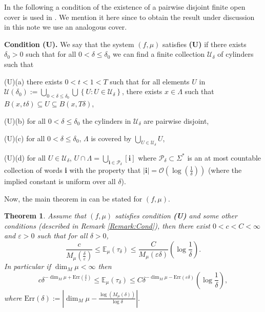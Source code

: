 \documentclass[11pt, reqno]{amsart}
\theoremstyle{plain}%
\newtheorem{theorem}{Theorem}[section]
\theoremstyle{definition}
\theoremstyle{definition}
\def\P{\ensuremath{\mathcal P}}
\def\E{\mathbb E}
\numberwithin{equation}{section}
\begin{document}
 In the following a condition of the existence of a pairwise disjoint finite open cover is used in \cite{MikeNatali}. We mention it here since to obtain the result under discussion in this note we use an analogous cover.

\label{Condition (U)}\textbf{Condition (U).} We say that the system $(f,\mu)$ satisfies \textbf{(U)} if there exists $\delta_0>0$ such that for all $0<\delta\le \delta_0$ we can find a finite collection $\mathcal{U}_{\delta}$ of cylinders such that

(U)(a) there exists $0<t<1<T$ such that for all elements $U$ in $\mathcal{U}(\delta_0):=\bigcup_{0<\delta\le \delta_0}\bigcup\left\{U:U\in \mathcal{U}_{\delta}\right\} $, there exists $x\in\Lambda$ such that $B(x,t\delta)\subseteq  U \subseteq B(x,T\delta)$,

(U)(b) for all $0<\delta\le \delta_0$ the cylinders in $\mathcal{U}_{\delta}$ are pairwise disjoint,

(U)(c) for all $0<\delta\le \delta_0$, $\Lambda$ is covered by $\bigcup_{U\in\mathcal{U}_{\delta}}U$,

(U)(d) for all $U\in \mathcal{U}_{\delta}$, $U\cap\Lambda= \bigcup_{\textbf{i}\in\P_{\delta}}[\textbf{i}]$ where $\P_{\delta}\subset\Sigma^*$ is an at most countable collection of words \textbf{i} with the property that $|\textbf{i}|=\mathcal{O}(\log(\frac{1}{\delta}))$ (where the implied constant is uniform over all $\delta$).

Now, the main theorem in \cite{MikeNatali} can be stated for $(f,\mu)$.
\begin{theorem}\label{Th:MN_main_theorem}
    \cite[Theorem 2.2]{MikeNatali} Assume that $(f,\mu)$ satisfies condition \textbf{(U)} and some other conditions (described in Remark \ref{Remark:Cond}), then there exist $0<c<C<\infty$ and $\varepsilon>0$ such that for all $\delta>0$,
    $$\frac{c}{M_\mu(\frac{\delta}{\varepsilon})}\le\E_\mu(\tau_\delta)\le \frac{C}{M_\mu(\varepsilon \delta)}\left(\log\frac{1}{\delta}\right).$$
    In particular if $\dim_M\mu<\infty$ then
    $$c\delta^{-\dim_M\mu+\text{Err}(\frac{\delta}{\varepsilon})}\le \E_\mu(\tau_\delta)\le C\delta^{-\dim_M\mu-\text{Err}(\varepsilon\delta)}\left(\log\frac{1}{\delta}\right),$$
    where $\text{Err}(\delta):=\left|\dim_M\mu-\frac{\log(M_\mu(\delta))}{\log\delta}\right|.$
\end{theorem}
\end{document}

